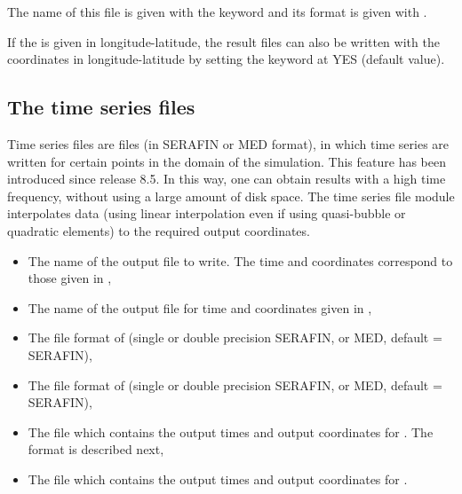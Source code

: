 The name of this file is given with the keyword 
and its format is given with .

If the  is given in longitude-latitude, the result files
can also be written with the coordinates in longitude-latitude
by setting the keyword 
at YES (default value).


\subsection{The time series files}
Time series files are files (in SERAFIN or MED format), in which time series are
written for certain points in the domain of the simulation.
This feature has been introduced since release 8.5.
In this way, one can obtain results with a high time frequency, without using
a large amount of disk space.
The time series file module interpolates data (using linear interpolation
even if using quasi-bubble or quadratic elements)
to the required output coordinates.
\begin{itemize}
\item {} The name of the output file to write.
The time and coordinates correspond to those given in
,
\item {} The name of the output file for time and
coordinates given in ,
\item {} The file format of
 (single or double precision SERAFIN, or MED,
default = SERAFIN),
\item {} The file format of
 (single or double precision SERAFIN, or MED,
default = SERAFIN),
\item {} The file which contains the output
times and output coordinates for .
The format is described next,
\item {} The file which contains the output
times and output coordinates for .
\end{itemize}

